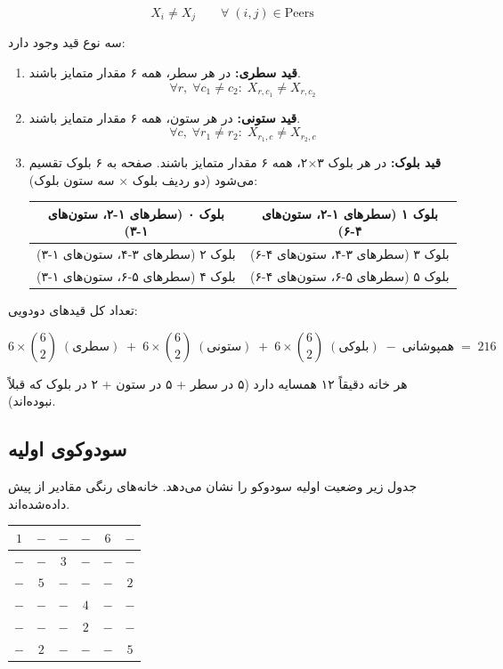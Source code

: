 \documentclass[10.5pt]{exam}
\begin{document}
\[
  X_i \neq X_j \qquad \forall\; (i,j) \in \text{Peers}
\]

سه نوع قید وجود دارد:

\begin{enumerate}
  \item \textbf{قید سطری:} در هر سطر، همه ۶ مقدار متمایز باشند.
    \[
      \forall r,\; \forall c_1 \neq c_2:\; X_{r,c_1} \neq X_{r,c_2}
    \]
  \item \textbf{قید ستونی:} در هر ستون، همه ۶ مقدار متمایز باشند.
    \[
      \forall c,\; \forall r_1 \neq r_2:\; X_{r_1,c} \neq X_{r_2,c}
    \]
  \item \textbf{قید بلوک:} در هر بلوک ۳×۲، همه ۶ مقدار متمایز باشند.
    صفحه به ۶ بلوک تقسیم می‌شود (دو ردیف بلوک × سه ستون بلوک):

    \begin{center}
    \begin{tabular}{|c|c|}
    \hline
    بلوک ۰ (سطرهای ۱-۲، ستون‌های ۱-۳) & بلوک ۱ (سطرهای ۱-۲، ستون‌های ۴-۶) \\
    \hline
    بلوک ۲ (سطرهای ۳-۴، ستون‌های ۱-۳) & بلوک ۳ (سطرهای ۳-۴، ستون‌های ۴-۶) \\
    \hline
    بلوک ۴ (سطرهای ۵-۶، ستون‌های ۱-۳) & بلوک ۵ (سطرهای ۵-۶، ستون‌های ۴-۶) \\
    \hline
    \end{tabular}
    \end{center}
\end{enumerate}

تعداد کل قیدهای دودویی:

\[
  6 \times \binom{6}{2} \;(\text{سطری}) \;+\; 6 \times \binom{6}{2} \;(\text{ستونی}) \;+\;
  6 \times \binom{6}{2} \;(\text{بلوکی}) \;-\; \text{همپوشانی} \;=\; 216
\]

هر خانه دقیقاً ۱۲ همسایه دارد (۵ در سطر + ۵ در ستون + ۲ در بلوک که قبلاً نبوده‌اند).


\subsection*{سودوکوی اولیه}


جدول زیر وضعیت اولیه سودوکو را نشان می‌دهد. خانه‌های رنگی مقادیر از پیش داده‌شده‌اند.

\begin{center}
\renewcommand{\arraystretch}{1.4}
\begin{tabular}{|c|c|c||c|c|c|}
\hline
\cellcolor{given}$1$ & $-$ & $-$ & $-$ & \cellcolor{given}$6$ & $-$ \\
\hline
$-$ & $-$ & \cellcolor{given}$3$ & $-$ & $-$ & $-$ \\
\hline\hline
$-$ & \cellcolor{given}$5$ & $-$ & $-$ & $-$ & \cellcolor{given}$2$ \\
\hline
$-$ & $-$ & $-$ & \cellcolor{given}$4$ & $-$ & $-$ \\
\hline\hline
$-$ & $-$ & $-$ & \cellcolor{given}$2$ & $-$ & $-$ \\
\hline
$-$ & \cellcolor{given}$2$ & $-$ & $-$ & $-$ & \cellcolor{given}$5$ \\
\hline
\end{tabular}
\end{center}
\end{document}
